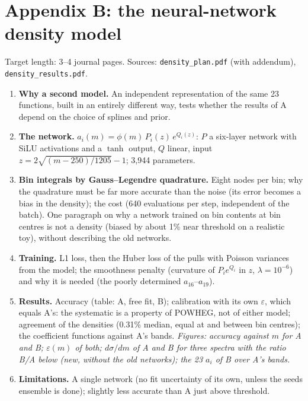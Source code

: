 \documentclass[11pt]{article}
\newcommand{\file}[1]{\nolinkurl{#1}}
\begin{document}
\section{Appendix B: the neural-network density model}
\label{sec:B}

Target length: 3--4 journal pages. Sources: \file{density_plan.pdf} (with addendum),
\file{density_results.pdf}.

\begin{enumerate}[label=\textbf{B.\arabic*}]
  \item \textbf{Why a second model.} An independent representation of the same 23 functions, built in an
    entirely different way, tests whether the results of A depend on the choice of splines and prior.
  \item \textbf{The network.} $a_i(m) = \phi(m)\,P_i(z)\,e^{Q_i(z)}$: $P$ a six-layer network with SiLU
    activations and a $\tanh$ output, $Q$ linear, input $z = 2\sqrt{(m-250)/1205}-1$; 3,944 parameters.
  \item \textbf{Bin integrals by Gauss--Legendre quadrature.} Eight nodes per bin; why the quadrature must be
    far more accurate than the noise (its error becomes a bias in the density); the cost (640 evaluations per
    step, independent of the batch). One paragraph on why a network trained on bin contents at bin centres
    is not a density (biased by about 1\% near threshold on a realistic toy), without describing the old
    networks.
  \item \textbf{Training.} L1 loss, then the Huber loss of the pulls with Poisson variances from the model;
    the smoothness penalty (curvature of $P_ie^{Q_i}$ in $z$, $\lambda = 10^{-6}$) and why it is needed (the
    poorly determined $a_{16}$--$a_{19}$).
  \item \textbf{Results.} Accuracy (table: A, free fit, B); calibration with its own $\varepsilon$, which
    equals A's: the systematic is a property of POWHEG, not of either model; agreement of the densities
    (0.31\% median, equal at and between bin centres); the coefficient functions against A's bands.
    \emph{Figures: accuracy against $m$ for A and B; $\varepsilon(m)$ of both;
    $d\sigma/dm$ of A and B for three spectra with the ratio B/A below (new, without the old networks); the
    23 $a_i$ of B over A's bands.}
  \item \textbf{Limitations.} A single network (no fit uncertainty of its own, unless the seeds ensemble is
    done); slightly less accurate than A just above threshold.
\end{enumerate}
\end{document}

